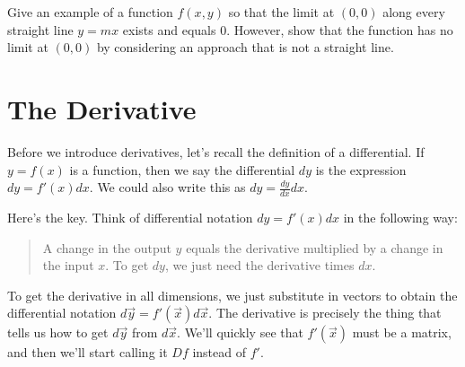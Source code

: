 \begin{problem*}[Challenge]
 Give an example of a function $f(x,y)$ so that the limit at $(0,0)$ along every straight line $y=mx$ exists and equals 0.  However, show that the function has no limit at $(0,0)$ by considering an approach that is not a straight line.
\end{problem*}














\section{The Derivative}

Before we introduce derivatives, let's recall the definition of a differential.  If $y=f(x)$ is a function, then we say the differential $dy$ is the expression $dy=f'(x) dx$.  We could also write this as $dy = \frac{dy}{dx}dx$. 


\begin{observation}
Here's the key.   Think of differential notation $dy=f'(x)dx$ in the following way: 
\begin{quote}
A change in the output $y$ equals the derivative multiplied by  a change in the input $x$. To get $dy$, we just need the derivative times $dx$. 
\end{quote}
To get the derivative in all dimensions, we just substitute in vectors to obtain the differential notation $d\vec y = f'(\vec x) d\vec x$. The derivative is precisely the thing that tells us how to get $d\vec y$ from $d\vec x$.  We'll quickly see that $f'(\vec x)$ must be a matrix, and then we'll start calling it $Df$ instead of $f'$. 
\end{observation}



